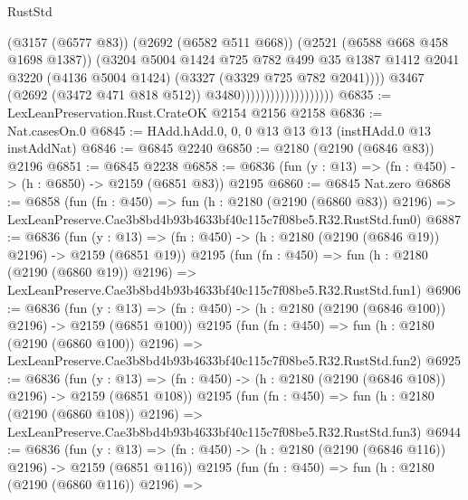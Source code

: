 \begin{lexlean}{RustStd}
\begin{coremodule}
                                            (@3157 (@6577 @83))
                                            (@2692 (@6582 @511 @668))
                                            (@2521 (@6588 @668 @458 @1698 @1387))
                                            (@3204
                                              @5004
                                              @1424
                                              @725
                                              @782
                                              @499
                                              @35
                                              @1387
                                              @1412
                                              @2041
                                              @3220
                                              (@4136 @5004 @1424)
                                              (@3327 (@3329 @725 @782 @2041))))
                                          @3467
                                          (@2692 (@3472 @471 @818 @512))
                                          @3480)))))))))))))))))))
@6835 := LexLeanPreservation.Rust.CrateOK @2154 @2156 @2158
@6836 := Nat.casesOn.{0}
@6845 := HAdd.hAdd.{0, 0, 0} @13 @13 @13 (instHAdd.{0} @13 instAddNat)
@6846 := @6845 @2240
@6850 := @2180 (@2190 (@6846 @83)) @2196
@6851 := @6845 @2238
@6858 := @6836 (fun (y : @13) => (fn : @450) -> (h : @6850) -> @2159 (@6851 @83)) @2195
@6860 := @6845 Nat.zero
@6868 := @6858
    (fun (fn : @450) =>
    fun (h : @2180 (@2190 (@6860 @83)) @2196) =>
    LexLeanPreserve.Cae3b8bd4b93b4633bf40c115c7f08be5.R32.RustStd.fun0)
@6887 := @6836
    (fun (y : @13) => (fn : @450) -> (h : @2180 (@2190 (@6846 @19)) @2196) -> @2159 (@6851 @19))
    @2195
    (fun (fn : @450) =>
    fun (h : @2180 (@2190 (@6860 @19)) @2196) =>
    LexLeanPreserve.Cae3b8bd4b93b4633bf40c115c7f08be5.R32.RustStd.fun1)
@6906 := @6836
    (fun (y : @13) => (fn : @450) -> (h : @2180 (@2190 (@6846 @100)) @2196) -> @2159 (@6851 @100))
    @2195
    (fun (fn : @450) =>
    fun (h : @2180 (@2190 (@6860 @100)) @2196) =>
    LexLeanPreserve.Cae3b8bd4b93b4633bf40c115c7f08be5.R32.RustStd.fun2)
@6925 := @6836
    (fun (y : @13) => (fn : @450) -> (h : @2180 (@2190 (@6846 @108)) @2196) -> @2159 (@6851 @108))
    @2195
    (fun (fn : @450) =>
    fun (h : @2180 (@2190 (@6860 @108)) @2196) =>
    LexLeanPreserve.Cae3b8bd4b93b4633bf40c115c7f08be5.R32.RustStd.fun3)
@6944 := @6836
    (fun (y : @13) => (fn : @450) -> (h : @2180 (@2190 (@6846 @116)) @2196) -> @2159 (@6851 @116))
    @2195
    (fun (fn : @450) =>
    fun (h : @2180 (@2190 (@6860 @116)) @2196) =>

\end{coremodule}
\end{lexlean}
